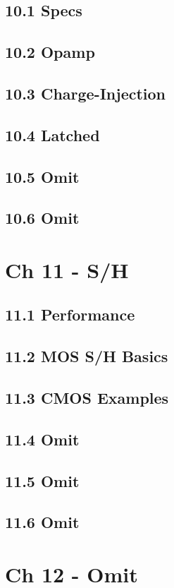 \documentclass[a4paper,twocolumn]{article}
\begin{document}
    \subsection{10.1 Specs}
    \subsection{10.2 Opamp}
    \subsection{10.3 Charge-Injection}
    \subsection{10.4 Latched}
    \subsection{10.5 Omit}
    \subsection{10.6 Omit}
  \section{Ch 11 - S/H}
    \subsection{11.1 Performance}
    \subsection{11.2 MOS S/H Basics}
    \subsection{11.3 CMOS Examples}
    \subsection{11.4 Omit}
    \subsection{11.5 Omit}
    \subsection{11.6 Omit}
  \section{Ch 12 - Omit}
\end{document}
